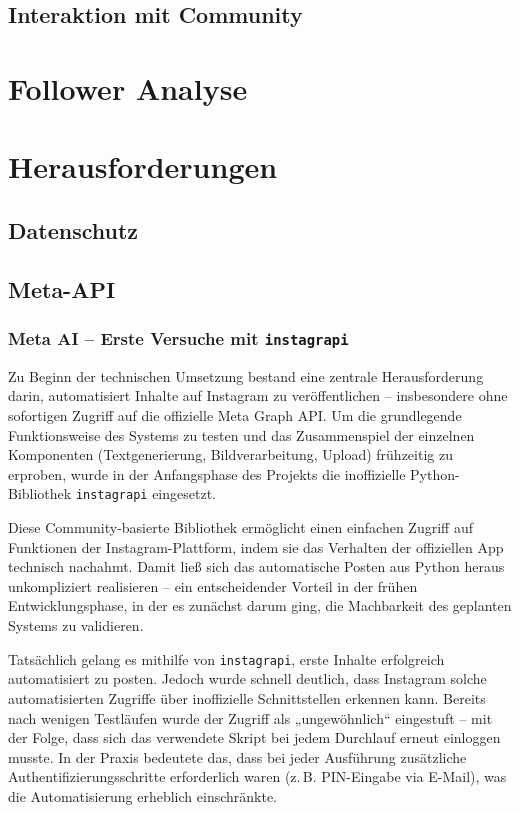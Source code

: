 \documentclass[a4paper,12pt]{article}
\begin{document}
\subsection{Interaktion mit Community}

\section{Follower Analyse}

\section{Herausforderungen}
\subsection{Datenschutz}
\subsection{Meta-API}
\subsubsection{Meta AI – Erste Versuche mit \texttt{instagrapi}}

Zu Beginn der technischen Umsetzung bestand eine zentrale Herausforderung darin, automatisiert Inhalte auf Instagram zu veröffentlichen – insbesondere ohne sofortigen Zugriff auf die offizielle Meta Graph API. Um die grundlegende Funktionsweise des Systems zu testen und das Zusammenspiel der einzelnen Komponenten (Textgenerierung, Bildverarbeitung, Upload) frühzeitig zu erproben, wurde in der Anfangsphase des Projekts die inoffizielle Python-Bibliothek \texttt{instagrapi} eingesetzt.

Diese Community-basierte Bibliothek ermöglicht einen einfachen Zugriff auf Funktionen der Instagram-Plattform, indem sie das Verhalten der offiziellen App technisch nachahmt. Damit ließ sich das automatische Posten aus Python heraus unkompliziert realisieren – ein entscheidender Vorteil in der frühen Entwicklungsphase, in der es zunächst darum ging, die Machbarkeit des geplanten Systems zu validieren.

Tatsächlich gelang es mithilfe von \texttt{instagrapi}, erste Inhalte erfolgreich automatisiert zu posten. Jedoch wurde schnell deutlich, dass Instagram solche automatisierten Zugriffe über inoffizielle Schnittstellen erkennen kann. Bereits nach wenigen Testläufen wurde der Zugriff als „ungewöhnlich“ eingestuft – mit der Folge, dass sich das verwendete Skript bei jedem Durchlauf erneut einloggen musste. In der Praxis bedeutete das, dass bei jeder Ausführung zusätzliche Authentifizierungsschritte erforderlich waren (z.\,B. PIN-Eingabe via E-Mail), was die Automatisierung erheblich einschränkte.
\end{document}
